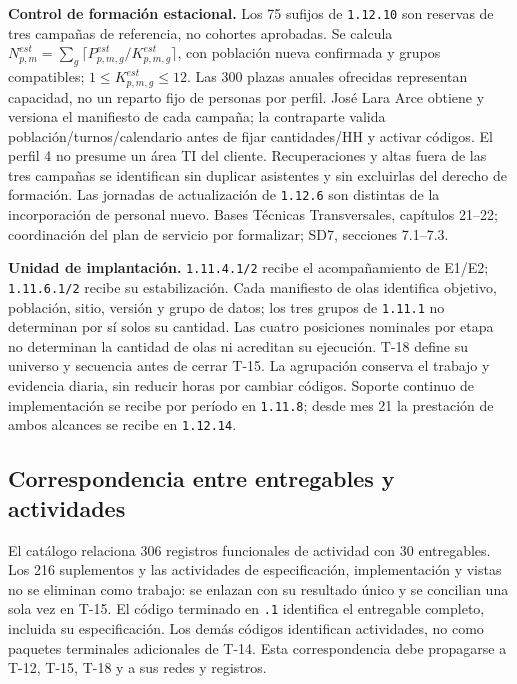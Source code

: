 \textbf{Control de formación estacional.} Los 75 sufijos de \texttt{1.12.10} son reservas de tres campañas de referencia, no cohortes aprobadas. Se calcula $N^{est}_{p,m}=\sum_g\lceil P^{est}_{p,m,g}/K^{est}_{p,m,g}\rceil$, con población nueva confirmada y grupos compatibles; $1\leq K^{est}_{p,m,g}\leq12$. Las 300 plazas anuales ofrecidas representan capacidad, no un reparto fijo de personas por perfil. José Lara Arce obtiene y versiona el manifiesto de cada campaña; la contraparte valida población/turnos/calendario antes de fijar cantidades/HH y activar códigos. El perfil 4 no presume un área TI del cliente. Recuperaciones y altas fuera de las tres campañas se identifican sin duplicar asistentes y sin excluirlas del derecho de formación. Las jornadas de actualización de \texttt{1.12.6} son distintas de la incorporación de personal nuevo. Bases Técnicas Transversales, capítulos 21--22; coordinación del plan de servicio por formalizar; SD7, secciones 7.1--7.3.

\textbf{Unidad de implantación.} \texttt{1.11.4.1/2} recibe el acompañamiento de E1/E2; \texttt{1.11.6.1/2} recibe su estabilización. Cada manifiesto de olas identifica objetivo, población, sitio, versión y grupo de datos; los tres grupos de \texttt{1.11.1} no determinan por sí solos su cantidad. Las cuatro posiciones nominales por etapa no determinan la cantidad de olas ni acreditan su ejecución. T-18 define su universo y secuencia antes de cerrar T-15. La agrupación conserva el trabajo y evidencia diaria, sin reducir horas por cambiar códigos. Soporte continuo de implementación se recibe por período en \texttt{1.11.8}; desde mes 21 la prestación de ambos alcances se recibe en \texttt{1.12.14}.

\subsection{Correspondencia entre entregables y actividades}
El catálogo relaciona 306 registros funcionales de actividad con 30 entregables. Los 216 suplementos y las actividades de especificación, implementación y vistas no se eliminan como trabajo: se enlazan con su resultado único y se concilian una sola vez en T-15. El código terminado en \texttt{.1} identifica el entregable completo, incluida su especificación. Los demás códigos identifican actividades, no como paquetes terminales adicionales de T-14. Esta correspondencia debe propagarse a T-12, T-15, T-18 y a sus redes y registros.

